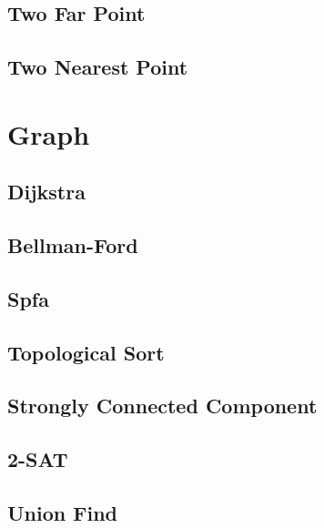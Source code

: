 \documentclass[10pt,landscape,a4paper,twocolumn]{article}
\begin{document}
\subsection{Two Far Point}


\subsection{Two Nearest Point}



\section{Graph}

\subsection{Dijkstra}


\subsection{Bellman-Ford}


\subsection{Spfa}


\subsection{Topological Sort}


\subsection{Strongly Connected Component}


\subsection{2-SAT}


\subsection{Union Find}

\end{document}
